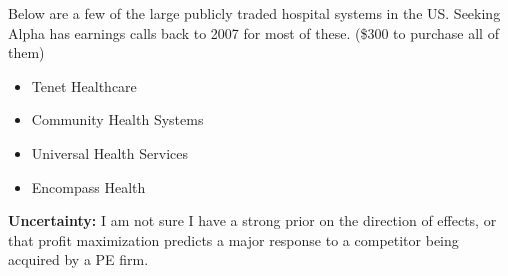 \documentclass[11pt]{article}
\begin{document}
Below are a few of the large publicly traded hospital systems in the US.
 Seeking Alpha has earnings calls back to 2007 for most of these. (\$300 to purchase all of them)
\begin{itemize}
\item Tenet Healthcare %
\item Community Health Systems %
\item Universal Health Services %
\item Encompass Health %
\end{itemize}


\textbf{Uncertainty:} I am not sure I have a strong prior on the direction of effects, or that profit maximization predicts a major response to a competitor being acquired by a PE firm. 
\end{document}
